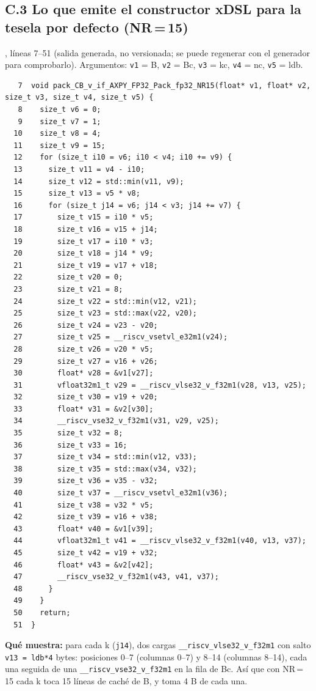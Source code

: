 \documentclass[10pt,a4paper]{article}
\begin{document}
\subsection*{C.3 Lo que emite el constructor xDSL para la tesela por defecto (NR\,=\,15)}
, líneas 7--51 (salida generada, no
versionada; se puede regenerar con el generador para comprobarlo). Argumentos: \texttt{v1} = B, \texttt{v2} = Bc, \texttt{v3} = kc,
\texttt{v4} = nc, \texttt{v5} = ldb.
{\footnotesize\begin{verbatim}
   7  void pack_CB_v_if_AXPY_FP32_Pack_fp32_NR15(float* v1, float* v2, size_t v3, size_t v4, size_t v5) {
   8    size_t v6 = 0;
   9    size_t v7 = 1;
  10    size_t v8 = 4;
  11    size_t v9 = 15;
  12    for (size_t i10 = v6; i10 < v4; i10 += v9) {
  13      size_t v11 = v4 - i10;
  14      size_t v12 = std::min(v11, v9);
  15      size_t v13 = v5 * v8;
  16      for (size_t j14 = v6; j14 < v3; j14 += v7) {
  17        size_t v15 = i10 * v5;
  18        size_t v16 = v15 + j14;
  19        size_t v17 = i10 * v3;
  20        size_t v18 = j14 * v9;
  21        size_t v19 = v17 + v18;
  22        size_t v20 = 0;
  23        size_t v21 = 8;
  24        size_t v22 = std::min(v12, v21);
  25        size_t v23 = std::max(v22, v20);
  26        size_t v24 = v23 - v20;
  27        size_t v25 = __riscv_vsetvl_e32m1(v24);
  28        size_t v26 = v20 * v5;
  29        size_t v27 = v16 + v26;
  30        float* v28 = &v1[v27];
  31        vfloat32m1_t v29 = __riscv_vlse32_v_f32m1(v28, v13, v25);
  32        size_t v30 = v19 + v20;
  33        float* v31 = &v2[v30];
  34        __riscv_vse32_v_f32m1(v31, v29, v25);
  35        size_t v32 = 8;
  36        size_t v33 = 16;
  37        size_t v34 = std::min(v12, v33);
  38        size_t v35 = std::max(v34, v32);
  39        size_t v36 = v35 - v32;
  40        size_t v37 = __riscv_vsetvl_e32m1(v36);
  41        size_t v38 = v32 * v5;
  42        size_t v39 = v16 + v38;
  43        float* v40 = &v1[v39];
  44        vfloat32m1_t v41 = __riscv_vlse32_v_f32m1(v40, v13, v37);
  45        size_t v42 = v19 + v32;
  46        float* v43 = &v2[v42];
  47        __riscv_vse32_v_f32m1(v43, v41, v37);
  48      }
  49    }
  50    return;
  51  }
\end{verbatim}}

\textbf{Qué muestra:} para cada k (\texttt{j14}), dos cargas \texttt{\_\_riscv\_vlse32\_v\_f32m1} con salto \texttt{v13 = ldb*4}
bytes: posiciones 0--7 (columnas 0--7) y 8--14 (columnas 8--14), cada una seguida de una \texttt{\_\_riscv\_vse32\_v\_f32m1} en la
fila de Bc. Así que con NR\,=\,15 cada k toca 15 líneas de caché de B, y toma 4 B de cada una.
\end{document}
